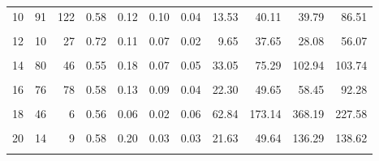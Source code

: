 \documentclass[
]{article}
\begin{document}
\begin{table}
\begin{tabular}[t]{lrrrrrrrrrr}
10 & 91 & 122 & 0.58 & 0.12 & 0.10 & 0.04 & 13.53 & 40.11 & 39.79 & 86.51\\
\cellcolor{gray!6}{11} & \cellcolor{gray!6}{67} & \cellcolor{gray!6}{31} & \cellcolor{gray!6}{0.58} & \cellcolor{gray!6}{0.12} & \cellcolor{gray!6}{0.07} & \cellcolor{gray!6}{0.04} & \cellcolor{gray!6}{43.81} & \cellcolor{gray!6}{91.61} & \cellcolor{gray!6}{109.77} & \cellcolor{gray!6}{135.80}\\
12 & 10 & 27 & 0.72 & 0.11 & 0.07 & 0.02 & 9.65 & 37.65 & 28.08 & 56.07\\
\cellcolor{gray!6}{13} & \cellcolor{gray!6}{69} & \cellcolor{gray!6}{51} & \cellcolor{gray!6}{0.58} & \cellcolor{gray!6}{0.15} & \cellcolor{gray!6}{0.07} & \cellcolor{gray!6}{0.05} & \cellcolor{gray!6}{27.74} & \cellcolor{gray!6}{55.13} & \cellcolor{gray!6}{56.51} & \cellcolor{gray!6}{96.41}\\
14 & 80 & 46 & 0.55 & 0.18 & 0.07 & 0.05 & 33.05 & 75.29 & 102.94 & 103.74\\
\cellcolor{gray!6}{15} & \cellcolor{gray!6}{80} & \cellcolor{gray!6}{144} & \cellcolor{gray!6}{0.52} & \cellcolor{gray!6}{0.10} & \cellcolor{gray!6}{0.11} & \cellcolor{gray!6}{0.07} & \cellcolor{gray!6}{24.58} & \cellcolor{gray!6}{51.12} & \cellcolor{gray!6}{52.48} & \cellcolor{gray!6}{58.61}\\
16 & 76 & 78 & 0.58 & 0.13 & 0.09 & 0.04 & 22.30 & 49.65 & 58.45 & 92.28\\
\cellcolor{gray!6}{17} & \cellcolor{gray!6}{30} & \cellcolor{gray!6}{9} & \cellcolor{gray!6}{0.55} & \cellcolor{gray!6}{0.22} & \cellcolor{gray!6}{0.04} & \cellcolor{gray!6}{0.04} & \cellcolor{gray!6}{41.59} & \cellcolor{gray!6}{59.62} & \cellcolor{gray!6}{160.40} & \cellcolor{gray!6}{175.02}\\
18 & 46 & 6 & 0.56 & 0.06 & 0.02 & 0.06 & 62.84 & 173.14 & 368.19 & 227.58\\
\cellcolor{gray!6}{19} & \cellcolor{gray!6}{20} & \cellcolor{gray!6}{3} & \cellcolor{gray!6}{0.68} & \cellcolor{gray!6}{0.15} & \cellcolor{gray!6}{0.00} & \cellcolor{gray!6}{0.06} & \cellcolor{gray!6}{83.63} & \cellcolor{gray!6}{183.90} & \cellcolor{gray!6}{} & \cellcolor{gray!6}{324.63}\\
20 & 14 & 9 & 0.58 & 0.20 & 0.03 & 0.03 & 21.63 & 49.64 & 136.29 & 138.62\\
\cellcolor{gray!6}{21} & \cellcolor{gray!6}{52} & \cellcolor{gray!6}{66} & \cellcolor{gray!6}{0.61} & \cellcolor{gray!6}{0.15} & \cellcolor{gray!6}{0.07} & \cellcolor{gray!6}{0.03} & \cellcolor{gray!6}{12.20} & \cellcolor{gray!6}{35.95} & \cellcolor{gray!6}{48.67} & \cellcolor{gray!6}{63.86}\\

\end{tabular}
\end{table}
\end{document}
